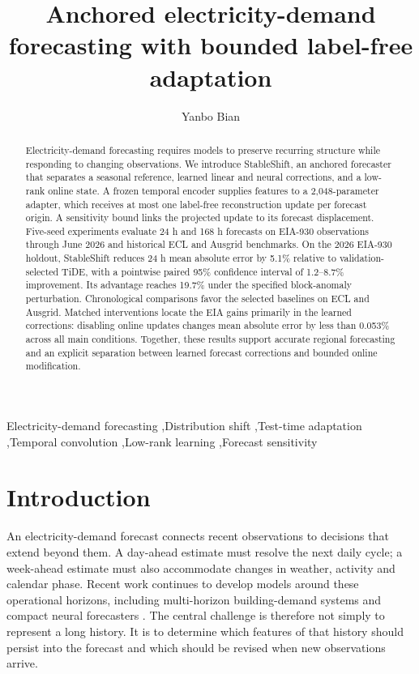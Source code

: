 \documentclass[final,5p,times]{elsarticle}
\begin{document}
\begin{frontmatter}
\title{Anchored electricity-demand forecasting with bounded label-free adaptation}
\author[bjtu]{Yanbo Bian}
\begin{abstract}
Electricity-demand forecasting requires models to preserve recurring structure while responding to changing observations. We introduce StableShift, an anchored forecaster that separates a seasonal reference, learned linear and neural corrections, and a low-rank online state. A frozen temporal encoder supplies features to a 2,048-parameter adapter, which receives at most one label-free reconstruction update per forecast origin. A sensitivity bound links the projected update to its forecast displacement. Five-seed experiments evaluate 24 h and 168 h forecasts on EIA-930 observations through June 2026 and historical ECL and Ausgrid benchmarks. On the 2026 EIA-930 holdout, StableShift reduces 24 h mean absolute error by 5.1\% relative to validation-selected TiDE, with a pointwise paired 95\% confidence interval of 1.2--8.7\% improvement. Its advantage reaches 19.7\% under the specified block-anomaly perturbation. Chronological comparisons favor the selected baselines on ECL and Ausgrid. Matched interventions locate the EIA gains primarily in the learned corrections: disabling online updates changes mean absolute error by less than 0.053\% across all main conditions. Together, these results support accurate regional forecasting and an explicit separation between learned forecast corrections and bounded online modification.
\end{abstract}
\begin{keyword}
Electricity-demand forecasting \sep Distribution shift \sep Test-time adaptation \sep Temporal convolution \sep Low-rank learning \sep Forecast sensitivity
\end{keyword}
\end{frontmatter}

\section{Introduction}
An electricity-demand forecast connects recent observations to decisions that extend beyond them. A day-ahead estimate must resolve the next daily cycle; a week-ahead estimate must also accommodate changes in weather, activity and calendar phase. Recent work continues to develop models around these operational horizons, including multi-horizon building-demand systems and compact neural forecasters \cite{baydan2026operational,forootani2026compact}. The central challenge is therefore not simply to represent a long history. It is to determine which features of that history should persist into the forecast and which should be revised when new observations arrive.
\end{document}
